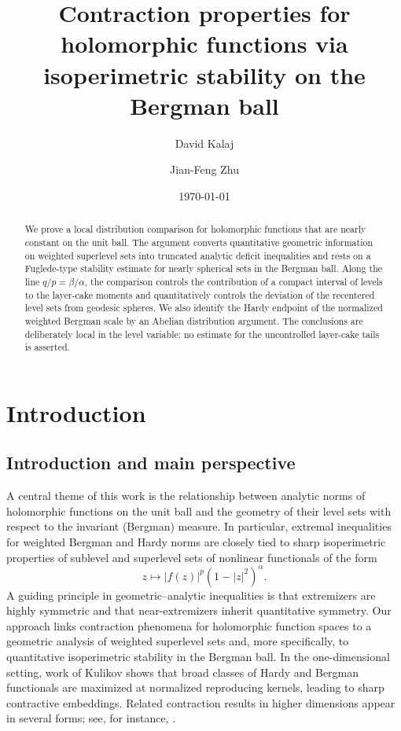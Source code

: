 \documentclass[11pt]{amsart}
\title[Contraction via isoperimetry on the Bergman ball]{Contraction properties for holomorphic functions via isoperimetric stability on the Bergman ball}
\author{David Kalaj}
\author{Jian-Feng Zhu}
\date{\today}
\theoremstyle{plain}
\theoremstyle{definition}
\theoremstyle{remark}
\begin{document}
\begin{abstract}
We prove a local distribution comparison for holomorphic functions that are
nearly constant on the unit ball. The argument converts quantitative geometric
information on weighted superlevel sets into truncated analytic deficit
inequalities and rests on a Fuglede-type stability estimate for nearly
spherical sets in the Bergman ball. Along the line
$q/p=\beta/\alpha$, the comparison controls the contribution of a compact
interval of levels to the layer-cake moments and quantitatively controls the
deviation of the recentered level sets from geodesic spheres. We also identify
the Hardy endpoint of the normalized weighted Bergman scale by an Abelian
distribution argument. The conclusions are deliberately local in the level
variable: no estimate for the uncontrolled layer-cake tails is asserted.
\end{abstract}
\maketitle


\section{Introduction}
\subsection{Introduction and main perspective}

A central theme of this work is the relationship between analytic norms of
holomorphic functions on the unit ball and the geometry of their level sets
with respect to the invariant (Bergman) measure. In particular, extremal
inequalities for weighted Bergman and Hardy norms are closely tied to sharp
isoperimetric properties of sublevel and superlevel sets of nonlinear
functionals of the form
\[
z \longmapsto |f(z)|^{p}(1-|z|^2)^{\alpha}.
\]
A guiding principle in geometric--analytic inequalities is that extremizers are
highly symmetric and that near-extremizers inherit quantitative symmetry. Our
approach links contraction phenomena for holomorphic function spaces to a
geometric analysis of weighted superlevel sets and, more specifically, to
quantitative isoperimetric stability in the Bergman ball. In the
one-dimensional setting, work of Kulikov shows that broad classes of Hardy and
Bergman functionals are maximized at normalized reproducing kernels, leading to
sharp contractive embeddings. Related contraction results in higher dimensions
appear in several forms; see, for instance,
\cite{KalajJFA2024LogM,KulikovGAFA2022,LiSuCHB2024}.
\end{document}
